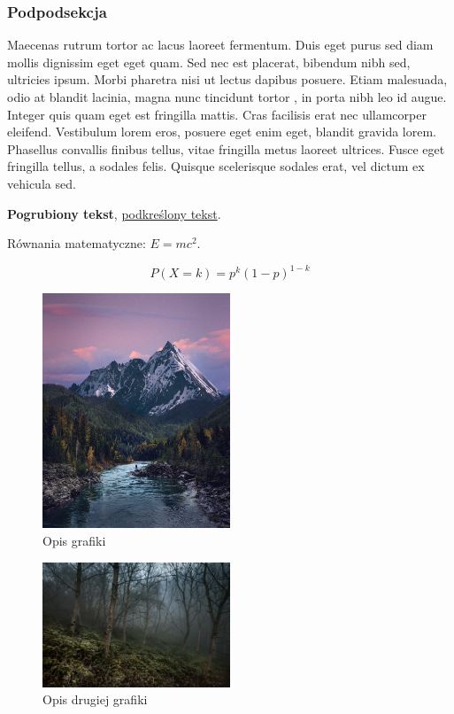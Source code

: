 \documentclass{article}
\begin{document}
\subsubsection{Podpodsekcja}
Maecenas rutrum tortor ac lacus laoreet fermentum. Duis eget purus sed diam mollis dignissim eget eget quam. Sed nec est placerat, bibendum nibh sed, ultricies ipsum. Morbi pharetra nisi ut lectus dapibus posuere. Etiam malesuada, odio at blandit lacinia, magna nunc tincidunt tortor \cite{codd1970}, in porta nibh leo id augue. Integer quis quam eget est fringilla mattis. Cras facilisis erat nec ullamcorper eleifend. Vestibulum lorem eros, posuere eget enim eget, blandit gravida lorem. Phasellus convallis finibus tellus, vitae fringilla metus laoreet ultrices. Fusce eget fringilla tellus, a sodales felis. Quisque scelerisque sodales erat, vel dictum ex vehicula sed.

\textbf{Pogrubiony tekst}, \underline{podkreślony tekst}.

Równania matematyczne: $E=mc^2$.

\begin{equation}
    P(X=k) = p^k (1-p)^{1-k}
\end{equation}
\begin{figure}[h]
\centering
\includegraphics[width=0.5\textwidth]{valley.jpg}
\caption{Opis grafiki}
\label{fig:grafika1}
\end{figure}

\begin{figure}[h]
\centering
\includegraphics[width=0.5\textwidth]{foggy.jpg}
\caption{Opis drugiej grafiki}
\label{fig:grafika2}
\end{figure}
\end{document}
